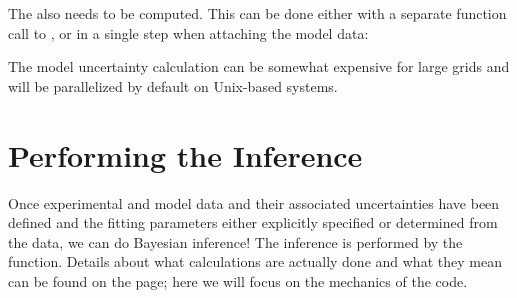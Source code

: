 \documentclass[letterpaper,10pt,english]{sphinxmanual}
\begin{document}
The {\hyperref[\detokenize{bayesics:model-uncertainty}]{}} also needs to be computed. This can be done either with a separate function call to , or in a single step when attaching the model data:

%
\begin{sphinxVerbatim}[commandchars=\\\{\}]
  
\end{sphinxVerbatim}

The model uncertainty calculation can be somewhat expensive for large grids and will be parallelized by default on Unix-based systems.


\section{Performing the Inference}
\label{\detokenize{manual:performing-the-inference}}
Once experimental and model data and their associated uncertainties have been defined and the fitting parameters either explicitly specified or determined from the data, we can do Bayesian inference! The inference is performed by the  function. Details about what calculations are actually done and what they mean can be found on the {\hyperref[\detokenize{bayesics::doc}]{}} page; here we will focus on the mechanics of the code.
\end{document}
